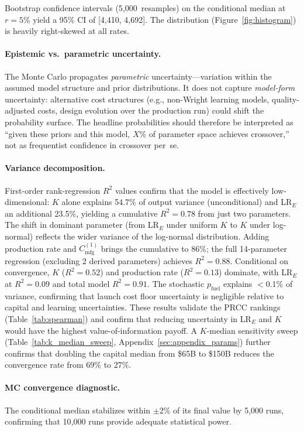 \documentclass[preprint,12pt]{elsarticle}
\begin{document}
Bootstrap confidence intervals (5{,}000~resamples) on the conditional median at $r = 5\%$ yield a 95\% CI of [4{,}410, 4{,}692]. The distribution (Figure~\ref{fig:histogram}) is heavily right-skewed at all rates.

\paragraph{Epistemic vs.\ parametric uncertainty.} The Monte Carlo propagates \emph{parametric} uncertainty---variation within the assumed model structure and prior distributions. It does not capture \emph{model-form} uncertainty: alternative cost structures (e.g., non-Wright learning models, quality-adjusted costs, design evolution over the production run) could shift the probability surface. The headline probabilities should therefore be interpreted as ``given these priors and this model, $X$\% of parameter space achieves crossover,'' not as frequentist confidence in crossover per~se.

\paragraph{Variance decomposition.}
\label{sec:sobol}
First-order rank-regression $R^2$ values confirm that the model is effectively low-dimensional: $K$ alone explains 54.7\% of output variance (unconditional) and LR$_E$ an additional 23.5\%, yielding a cumulative $R^2 = 0.78$ from just two parameters. The shift in dominant parameter (from LR$_E$ under uniform $K$ to $K$ under log-normal) reflects the wider variance of the log-normal distribution. Adding production rate and $C_{\mathrm{mfg}}^{(1)}$ brings the cumulative to 86\%; the full 14-parameter regression (excluding 2 derived parameters) achieves $R^2 = 0.88$. Conditional on convergence, $K$ ($R^2 = 0.52$) and production rate ($R^2 = 0.13$) dominate, with LR$_E$ at $R^2 = 0.09$ and total model $R^2 = 0.91$. The stochastic $p_{\mathrm{fuel}}$ explains $<$0.1\% of variance, confirming that launch cost floor uncertainty is negligible relative to capital and learning uncertainties. These results validate the PRCC rankings (Table~\ref{tab:spearman}) and confirm that reducing uncertainty in LR$_E$ and $K$ would have the highest value-of-information payoff. A $K$-median sensitivity sweep (Table~\ref{tab:k_median_sweep}, Appendix~\ref{sec:appendix_params}) further confirms that doubling the capital median from \$65B to \$150B reduces the convergence rate from 69\% to 27\%.

\paragraph{MC convergence diagnostic.} The conditional median stabilizes within $\pm$2\% of its final value by 5{,}000 runs, confirming that 10{,}000 runs provide adequate statistical power.
\end{document}
